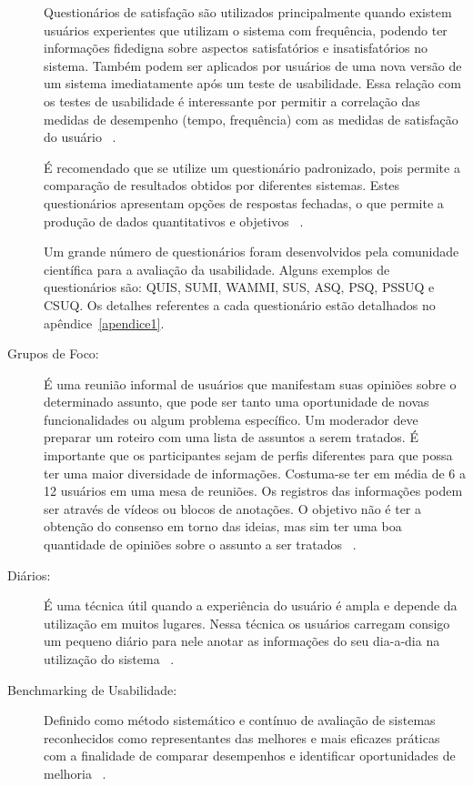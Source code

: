 \begin{description}
	Questionários de satisfação são utilizados principalmente quando existem usuários experientes que utilizam o sistema com frequência, podendo ter informações fidedigna sobre aspectos satisfatórios e insatisfatórios no sistema. Também podem ser aplicados por usuários de uma nova versão de um sistema imediatamente após um teste de usabilidade. Essa relação com os testes de usabilidade é interessante por permitir a correlação das medidas de desempenho (tempo, frequência) com as medidas de satisfação do usuário ~\cite{cybis2010}.

	É recomendado que se utilize um questionário padronizado, pois permite a comparação de resultados obtidos por diferentes sistemas. Estes questionários apresentam opções de respostas fechadas, o que permite a produção de dados quantitativos e objetivos ~\cite{cybis2010}.

	Um grande número de questionários foram desenvolvidos pela comunidade científica para a avaliação da usabilidade.  Alguns exemplos de questionários são: QUIS, SUMI,  WAMMI, SUS, ASQ, PSQ, PSSUQ e CSUQ. Os detalhes referentes a cada questionário estão detalhados no apêndice~\ref{apendice1}.

\item[Grupos de Foco:]

É uma reunião informal de usuários que manifestam suas opiniões sobre o determinado assunto, que pode ser tanto uma oportunidade de novas funcionalidades ou algum problema específico.
%
Um moderador deve preparar um roteiro  com uma lista de assuntos a serem tratados. É importante que os participantes sejam de perfis diferentes para que possa ter uma maior diversidade de informações. Costuma-se ter em média de 6 a 12 usuários em uma mesa de reuniões. Os registros das informações podem ser através de vídeos ou blocos de anotações. O objetivo não é ter a obtenção do consenso em torno das ideias, mas sim ter uma boa quantidade de opiniões sobre o assunto a ser tratados ~\cite{cybis2010}.


\item[Diários:]

	É uma técnica útil quando a experiência do usuário é ampla e depende da utilização em muitos lugares. Nessa técnica os usuários carregam consigo um pequeno diário para nele anotar as informações do seu dia-a-dia na utilização do sistema ~\cite{cybis2010}.

\item[Benchmarking de Usabilidade:]

	Definido como método sistemático e contínuo de avaliação de sistemas reconhecidos como representantes das melhores e mais eficazes práticas com a finalidade de comparar desempenhos e identificar oportunidades de melhoria ~\cite{spendolini1994}.


\end{description}

